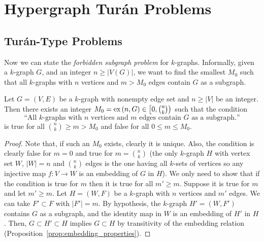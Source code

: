 
\section{Hypergraph Turán Problems}\label{sec:extremal}

\subsection{Turán-Type Problems}\label{subsec:turan}

Now we can state the \emph{forbidden subgraph problem} for $k$-graphs.
Informally, given a $k$-graph $G$, and an integer $n \geq |V(G)|$,
we want to find the smallest $M_0$ such that all $k$-graphs with $n$ vertices and $m > M_0$ edges
contain $G$ as a subgraph.

\begin{proposition} \label{prop:extremal}
    Let $G = (V, E)$ be a $k$-graph with nonempty edge set and $n \geq |V|$ be an integer.
    Then there exists an integer $M_0 = \text{ex} \left( n, G \right) \in \left[ 0, \binom{n}{k}\right)$ such that
    the condition
    \[
        \text{``All $k$-graphs with $n$ vertices and $m$ edges contain $G$ as a subgraph.''}
    \]
    is true for all $\binom{n}{k} \geq m > M_0$ and false for all $0 \leq m \leq M_0$.

    \begin{proof}
        Note that, if such an $M_0$ exists, clearly it is unique.
        Also, the condition is clearly false for $m = 0$ and
        true for $m = \binom{n}{k}$
        (the only $k$-graph $H$ with vertex set $W$, $|W|=n$ and $\binom{n}{k}$ edges
        is the one having all $k$-sets of vertices so any injective map $f: V \to W$
        is an embedding of $G$ in $H$).
        We only need to show that if the condition is true for $m$ then it is true for
        all $m' \geq m$.
        Suppose it is true for $m$ and let $m' \geq m$.
        Let $H = (W, F)$ be a $k$-graph with $n$ vertices and $m'$ edges.
        We can take $F' \subset F$ with $|F'| = m$.
        By hypothesis, the $k$-graph $H' = (W, F')$ contains $G$ as a subgraph,
        and the identity map in $W$ is an embedding of $H'$ in $H$.
        Then, $G \subset H' \subset H$ implies $G \subset H$ by transitivity of the embedding
        relation (Proposition~\ref{prop:embedding_properties}).

    \end{proof}

\end{proposition}

